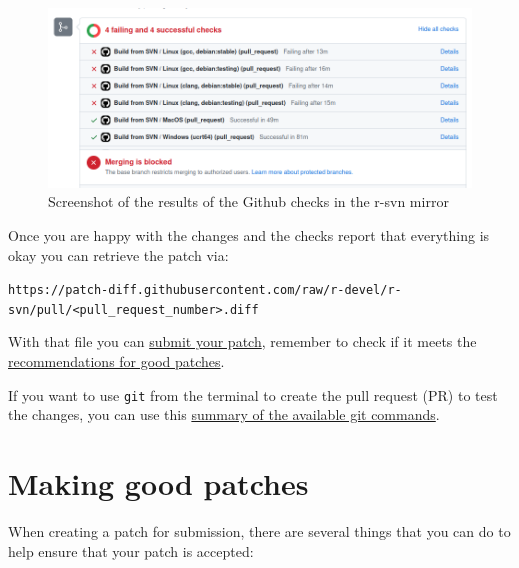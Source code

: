 \documentclass[
]{book}
\begin{document}
\begin{figure}
\centering
\includegraphics{img/rsvn_checks_results.png}
\caption{Screenshot of the results of the Github checks in the r-svn mirror}
\end{figure}

Once you are happy with the changes and the checks report that everything is okay you can retrieve the patch via:

\texttt{https://patch-diff.githubusercontent.com/raw/r-devel/r-svn/pull/\textless{}pull\_request\_number\textgreater{}.diff}

With that file you can \protect\hyperlink{SubmitPatches}{submit your patch}, remember to check if it meets the \protect\hyperlink{GoodPatches}{recommendations for good patches}.

If you want to use \texttt{git} from the terminal to create the pull request (PR) to test the changes, you can use this \href{https://about.gitlab.com/images/press/git-cheat-sheet.pdf}{summary of the available git commands}.

\hypertarget{GoodPatches}{%
\section{Making good patches}\label{GoodPatches}}

When creating a patch for submission, there are several things that you can do to help ensure that your patch is accepted:
\end{document}
